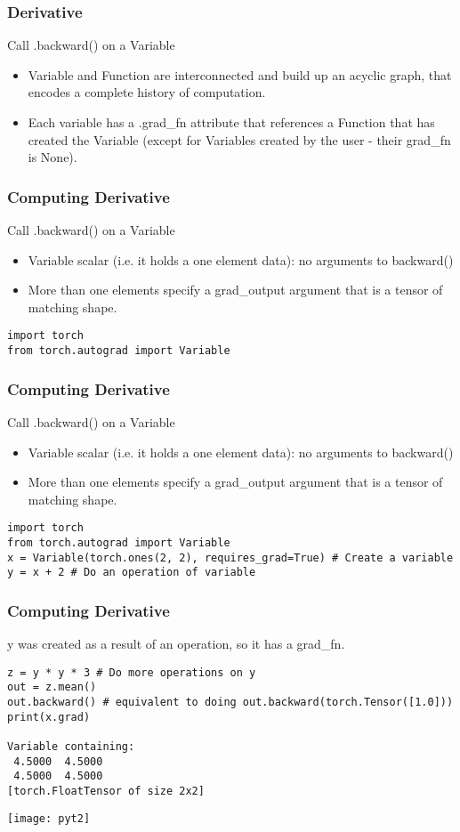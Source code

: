 \begin{frame}[fragile] \frametitle{Derivative}
Call .backward() on a Variable
\begin{itemize}
\item Variable and Function are interconnected and build up an acyclic graph, that encodes a complete history of computation.
\item Each variable has a .grad\_fn attribute that references a Function that has created the Variable (except for Variables created by the user - their grad\_fn is None).
\end{itemize}
\end{frame}

\begin{frame}[fragile] \frametitle{Computing Derivative}
Call .backward() on a Variable
\begin{itemize}
\item Variable scalar (i.e. it holds a one element data): no arguments to backward()
\item More than one elements specify a grad\_output argument that is a tensor of matching shape.
\end{itemize}
\begin{lstlisting}
import torch
from torch.autograd import Variable
\end{lstlisting}
\end{frame}

\begin{frame}[fragile] \frametitle{Computing Derivative}
Call .backward() on a Variable
\begin{itemize}
\item Variable scalar (i.e. it holds a one element data): no arguments to backward()
\item More than one elements specify a grad\_output argument that is a tensor of matching shape.
\end{itemize}
\begin{lstlisting}
import torch
from torch.autograd import Variable
x = Variable(torch.ones(2, 2), requires_grad=True) # Create a variable
y = x + 2 # Do an operation of variable

\end{lstlisting}
\end{frame}


\begin{frame}[fragile] \frametitle{Computing Derivative}
y was created as a result of an operation, so it has a grad\_fn.
\begin{lstlisting}
z = y * y * 3 # Do more operations on y
out = z.mean()
out.backward() # equivalent to doing out.backward(torch.Tensor([1.0]))
print(x.grad)

Variable containing:
 4.5000  4.5000
 4.5000  4.5000
[torch.FloatTensor of size 2x2]
\end{lstlisting}
\begin{center}
\texttt{[image: pyt2]}
\end{center}
\end{frame}


